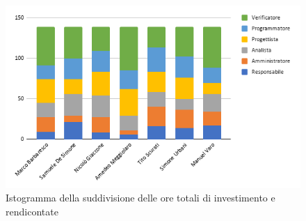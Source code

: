             \begin{figure}[!h]
                \vspace{5px}
                \includegraphics[scale=0.6]{../../../Images/Diagrammi/Istogrammi/ore totali.png}
                \centering
                \caption{Istogramma della suddivisione delle ore totali di investimento e rendicontate}
            \end{figure}

